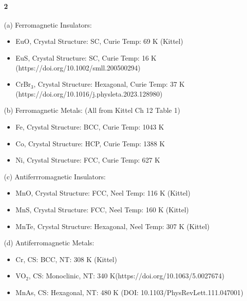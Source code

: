\documentclass[../main.tex]{subfiles}
\begin{document}
\paragraph*{2} (a) Ferromagnetic Insulators:
\begin{itemize}
    \item EuO, Crystal Structure: SC, Curie Temp: 69 K (Kittel)
    \item EuS, Crystal Structure: SC, Curie Temp: 16 K (https://doi.org/10.1002/smll.200500294)
    \item CrBr$_3$, Crystal Structure: Hexagonal, Curie Temp: 37 K (https://doi.org/10.1016/j.physleta.2023.128980)
\end{itemize}
(b) Ferromagnetic Metals: (All from Kittel Ch 12 Table 1)
\begin{itemize}
    \item Fe, Crystal Structure: BCC, Curie Temp: 1043 K
    \item Co, Crystal Structure: HCP, Curie Temp: 1388 K
    \item Ni, Crystal Structure: FCC, Curie Temp: 627 K
\end{itemize}
(c) Antiferrromagnetic Insulators:
\begin{itemize}
    \item MnO, Crystal Structure: FCC, Neel Temp: 116 K (Kittel)
    \item MnS, Crystal Structure: FCC, Neel Temp: 160 K (Kittel)
    \item MnTe, Crystal Structure: Hexagonal, Neel Temp: 307 K (Kittel)
\end{itemize}
(d) Antiferromagnetic Metals:
\begin{itemize}
    \item Cr, CS: BCC, NT: 308 K (Kittel)
    \item VO$_2$, CS: Monoclinic, NT: 340 K(https://doi.org/10.1063/5.0027674)
    \item MnAs, CS: Hexagonal, NT: 480 K (DOI: 10.1103/PhysRevLett.111.047001)
\end{itemize}
\end{document}
